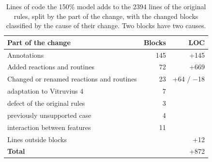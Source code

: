 \begin{table}[htbp]
    \centering
    \begin{tabular}{|l|r|r|}
        \hline
        \textbf{Part of the change}               & \textbf{Blocks} & \textbf{LOC} \\
        \hline
        Annotations                               & 145             & +145         \\
        \hline
        Added reactions and routines              & 72              & +669         \\
        \hline
        Changed or renamed reactions and routines & 23              & +64 / $-$18  \\
        \hline
        \quad adaptation to Vitruvius 4           & 7               &              \\
        \hline
        \quad defect of the original rules        & 3               &              \\
        \hline
        \quad previously unsupported case         & 4               &              \\
        \hline
        \quad interaction between features        & 11              &              \\
        \hline
        Lines outside blocks                      &                 & +12          \\
        \hline
        \textbf{Total}                            &                 & +872         \\
        \hline
    \end{tabular}
    \caption{Lines of code the 150\% model adds to the 2394 lines of the original rules, split by the part of the change, with the changed blocks classified by the cause of their change. Two blocks have two causes.}
    \label{table:changes-original-rules}
\end{table}

